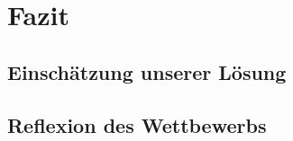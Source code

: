 \chapter{Fazit}
\label{ch:fazit}

\section{Einschätzung unserer Lösung}
\label{sec:einschaetzuung}

\section{Reflexion des Wettbewerbs}
\label{sec:reflexion}